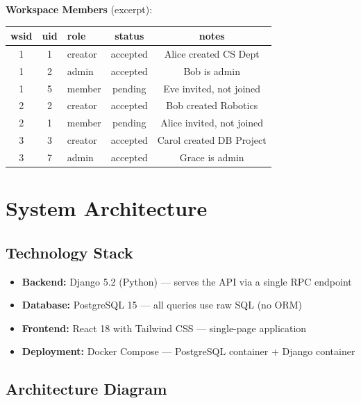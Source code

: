 \documentclass[11pt]{article}
\begin{document}
\noindent\textbf{Workspace Members} (excerpt):
\begin{center}
\tiny
\begin{tabular}{cclcc}
\toprule
wsid & uid & role & status & notes \\
\midrule
1 & 1 & creator & accepted & Alice created CS Dept \\
1 & 2 & admin & accepted & Bob is admin \\
1 & 5 & member & pending & Eve invited, not joined \\
2 & 2 & creator & accepted & Bob created Robotics \\
2 & 1 & member & pending & Alice invited, not joined \\
3 & 3 & creator & accepted & Carol created DB Project \\
3 & 7 & admin & accepted & Grace is admin \\
\bottomrule
\end{tabular}
\end{center}



\newpage
\section{System Architecture}
\label{sec:arch}

\subsection{Technology Stack}

\begin{itemize}
    \item \textbf{Backend:} Django 5.2 (Python) --- serves the API via a single RPC endpoint
    \item \textbf{Database:} PostgreSQL 15 --- all queries use raw SQL (no ORM)
    \item \textbf{Frontend:} React 18 with Tailwind CSS --- single-page application
    \item \textbf{Deployment:} Docker Compose --- PostgreSQL container + Django container
\end{itemize}

\subsection{Architecture Diagram}
\end{document}
